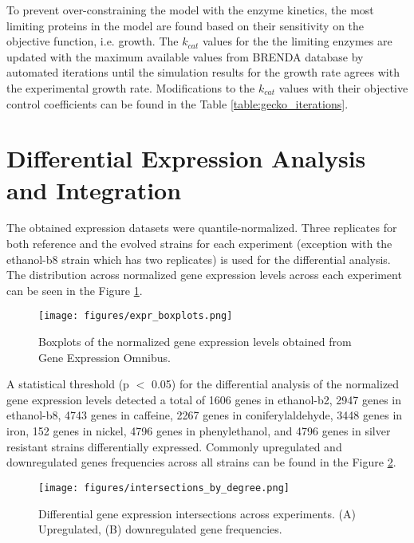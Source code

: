 To prevent over-constraining the model with the enzyme kinetics, the most limiting proteins in the model are found based on their sensitivity on the objective function, i.e. growth. The $k_{cat}$ values for the the limiting enzymes are updated with the maximum available values from BRENDA\cite{jeske2019brenda} database by automated iterations until the simulation results for the growth rate agrees with the experimental growth rate. Modifications to the $k_{cat}$ values with their objective control coefficients can be found in the Table \ref{table:gecko_iterations}.



\vspace{-0.5cm}
\section{Differential Expression Analysis and Integration}

The obtained expression datasets were quantile-normalized. Three replicates for both reference and the evolved strains for each experiment (exception with the ethanol-b8 strain which has two replicates) is used for the differential analysis. The distribution across normalized gene expression levels across each experiment can be seen in the Figure \ref{fig:expr_boxplot}.

\begin{figure}[H]
\begin{center}
\texttt{[image: figures/expr\_boxplots.png]}
\caption[Boxplots of the normalized gene expression levels]{Boxplots of the normalized gene expression levels obtained from Gene Expression Omnibus.}
\end{center}
\label{fig:expr_boxplot}
\end{figure}

A statistical threshold (p $<$ 0.05) for the differential analysis of the normalized gene expression levels detected a total of 1606 genes in ethanol-b2, 2947 genes in ethanol-b8, 4743 genes in caffeine, 2267 genes in coniferylaldehyde, 3448 genes in iron, 152 genes in nickel, 4796 genes in phenylethanol, and 4796 genes in silver resistant strains differentially expressed. Commonly upregulated and downregulated genes frequencies across all strains can be found in the Figure \ref{fig:intersections_genes}.

\begin{figure}[H]
\begin{center}
\texttt{[image: figures/intersections\_by\_degree.png]}
\caption[Differential gene expression intersections across experiments]{Differential gene expression intersections across experiments. (A) Upregulated, (B) downregulated gene frequencies.}
\end{center}
\label{fig:intersections_genes}
\end{figure}

